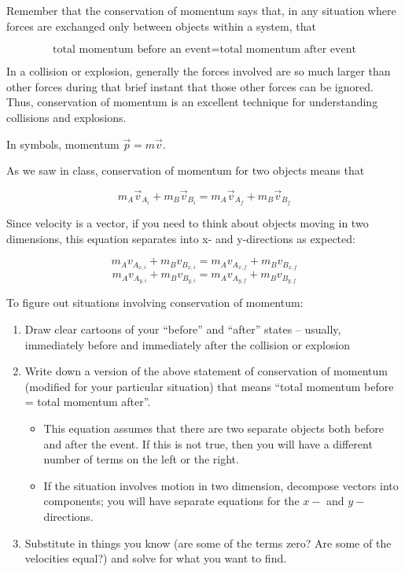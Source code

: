 \documentclass[12pt]{article}
\begin{document}
	\Large
	\centerline{}
	
	\normalsize
	\centerline{}
	
			
		
Remember that the conservation of momentum says that, in any situation where forces are exchanged only between objects within a system, that

$$\text{total momentum before an event} = \text {total momentum after event}$$

In a collision or explosion, generally the forces involved are so much larger than other forces during that brief instant that those other forces can be ignored. Thus, conservation of momentum is an excellent technique for understanding collisions and explosions.

In symbols, momentum $\vec p = m \vec v$.

As we saw in class, conservation of momentum for two objects means that

$$m_A \vec v_{A_i} + m_B \vec v_{B_i} = m_A \vec v_{A_f} + m_B \vec v_{B_f}$$

Since velocity is a vector, if you need to think about objects moving in two dimensions, this equation
separates into x- and y-directions as expected:

$$m_A v_{A_{x,i}} + m_B v_{B_{x,i}} = m_A v_{A_{x,f}} + m_B v_{B_{x,f}}$$
$$m_A v_{A_{y,i}} + m_B v_{B_{y,i}} = m_A v_{A_{y,f}} + m_B v_{B_{y,f}}$$


To figure out situations involving conservation of momentum:

\begin{enumerate}
	\item Draw clear cartoons of your ``before'' and ``after'' states -- usually, immediately before and immediately after the collision or explosion
	\item Write down a version of the above statement of conservation of momentum (modified for your particular situation) that means ``total momentum before = total momentum after''.
	\begin{itemize}
		\item This equation assumes that there are two separate objects both before and after the event. If this is not true, then you will have a different number of terms on the left or the right.
		\item If the situation involves motion in two dimension, decompose vectors into components; you will have separate equations for the $x-$ and $y-$directions.	\end{itemize}
	\item Substitute in things you know (are some of the terms zero? Are some of the velocities equal?) and solve for what you want to find.
\end{enumerate}
\end{document}
